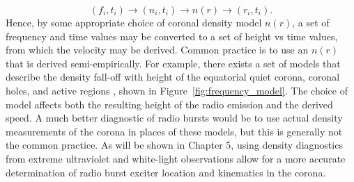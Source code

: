\begin{equation}
(f_i, t_i) \rightarrow (n_i,t_i) \rightarrow n(r) \rightarrow (r_i,t_i).
\end{equation}
Hence, by some appropriate choice of coronal density model $n(r)$, a set of frequency and time values may be converted to a set of height vs time values, from which the velocity may be derived.
Common practice is to use an $n(r)$ that is derived semi-empirically. For example, there exists a set of models that describe the density fall-off with height of the equatorial quiet corona, coronal holes, and active regions \citet{allen1947, newkirk1961, saito1977}, shown in Figure~\ref{fig:frequency_model}. The choice of model affects both the resulting height of the radio emission and the derived speed. A much better diagnostic of radio bursts would be to use actual density measurements of the corona in places of these models, but this is generally not the common practice. {\color{blue} As will be shown in Chapter 5, using density diagnostics from extreme ultraviolet and white-light observations allow for a more accurate determination of radio burst exciter location and kinematics in the corona.}














